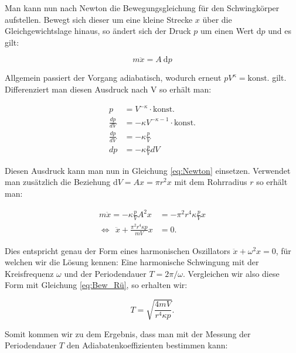 \documentclass{article}
\begin{document}
Man kann nun nach Newton die Bewegungsgleichung für den Schwingkörper aufstellen. Bewegt sich dieser um eine kleine Strecke $x$ über die Gleichgewichtslage hinaus, so ändert sich der Druck $p$ um einen Wert d$p$ und es gilt:

\begin{equation}
    m \ddot{x} = A \ \text{d}p
    \label{eq:Newton}
\end{equation}

Allgemein passiert der Vorgang adiabatisch, wodurch erneut $pV^\kappa = \text{konst.}$ gilt. Differenziert man diesen Ausdruck nach V so erhält man:

\begin{equation}
    \begin{split}
        p &= V^{-\kappa} \cdot \text{konst.} \\
        \frac{dp}{dV} &= - \kappa V^{-\kappa -1} \cdot \text{konst.} \\
        \frac{dp}{dV} &= - \kappa \frac{p}{V} \\
        dp &= - \kappa \frac{p}{V} dV
    \end{split}
\end{equation}

Diesen Ausdruck kann man nun in Gleichung \ref{eq:Newton} einsetzen. Verwendet man zusätzlich die Beziehung d$V = Ax = \pi r^2 x$ mit dem Rohrradius $r$ so erhält man:

\begin{equation}
    \begin{split}
        m \ddot{x} = - \kappa \frac{p}{V} A^2 x &= - \pi^2 r^4 \kappa \frac{p}{V} x \\
        \iff \ \ \ddot{x} + \frac{\pi^2 r^4 \kappa p}{mV} x &= 0.
    \end{split}
    \label{eq:Bew_Rü}
\end{equation}

Dies entspricht genau der Form eines harmonischen Oszillators $\ddot{x} + \omega^2 x = 0$, für welchen wir die Lösung kennen: Eine harmonische Schwingung mit der Kreisfrequenz $\omega$ und der Periodendauer $T = 2 \pi / \omega$. Vergleichen wir also diese Form mit Gleichung \ref{eq:Bew_Rü}, so erhalten wir:

\begin{equation}
    T = \sqrt{\frac{4mV}{r^4 \kappa p}}.
\end{equation}

Somit kommen wir zu dem Ergebnis, dass man mit der Messung der Periodendauer $T$ den Adiabatenkoeffizienten bestimmen kann:
\end{document}
